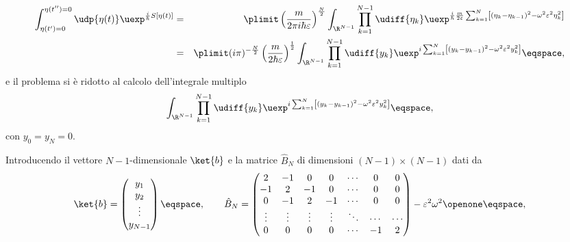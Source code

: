\begin{eqnarray*}
\int_{\eta(t') = 0}^{\eta(t'') = 0} \udp{\eta(t)} \uexp^{\frac{i}{\hbar}
S[\eta(t)]}
&=& \plimit 
\left( \frac{m}{2\pi i \hbar \varepsilon} \right)^{\frac{N}{2}} \int_{\R^{N-1}}
\prod_{k=1}^{N-1} \udiff{\eta_{k}} 
\uexp^{ \frac{i}{\hbar} \frac{m}{2\varepsilon} \sum_{k=1}^{N} \left[ \left(
\eta_{k} - \eta_{k-1} \right)^{2} - \omega^{2} \varepsilon^{2} \eta_{k}^{2}
\right]} \\
&=& 
\plimit ( i \pi) ^{ - \frac{N}{2}} \left( \frac{m}{2\hbar
\varepsilon}\right)^{\frac{1}{2}} 
\int_{\R^{N-1}}
\prod_{k=1}^{N-1} \udiff{y_{k}} \uexp^{ i \sum_{k=1}^{N} \left[ \left( y_{k} -
y_{k-1} \right)^{2} - \omega^{2} \varepsilon^{2} y_{k}^{2} \right]} \eqspace ,
\end{eqnarray*}
e il problema si \`e ridotto al calcolo dell'integrale multiplo
\begin{equation}\label{eq:ao gN}
\int_{\R^{N-1}}
\prod_{k=1}^{N-1} \udiff{y_{k}} \uexp^{ i \sum_{k=1}^{N} \left[ \left( y_{k} -
y_{k-1} \right)^{2} - \omega^{2} \varepsilon^{2} y_{k}^{2} \right]} \eqspace ,
\end{equation}
con $y_{0}  = y_{N} = 0$.
\par
Introducendo  il vettore $N-1$-dimensionale $\ket{b}$ e la matrice $\hat{B}_{N}$
di dimensioni $(N-1) \times (N-1)$ dati da
\begin{displaymath}
\ket{b} = \begin{pmatrix} y_{1} \\ y_{2} \\ \vdots \\ y_{N-1} \end{pmatrix}
\eqspace,  \qquad 
\hat{B}_{N} = 
\begin{pmatrix}  
2      & -1     & 0      & 0      & \cdots & 0      & 0 \\
-1     & 2      & -1     & 0      & \cdots & 0      & 0 \\
0      & -1     & 2      & -1     & \cdots & 0      & 0 \\
\vdots & \vdots & \vdots & \vdots & \ddots & \cdots & \cdots \\
0      & 0      & 0      & 0      & \cdots & -1     & 2
\end{pmatrix}  -  \varepsilon^{2} \omega^{2} \openone \eqspace, 
\end{displaymath}
